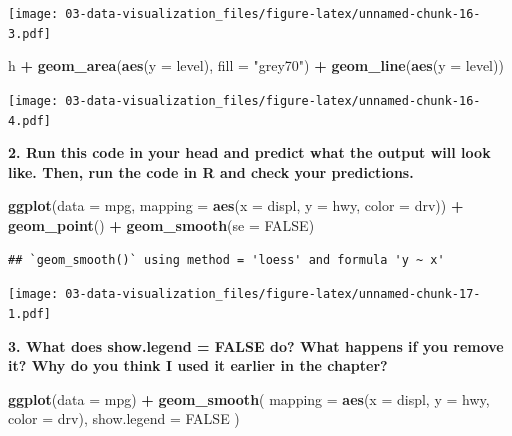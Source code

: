 \documentclass[]{book}
\newenvironment{Shaded}{\begin{snugshade}}{\end{snugshade}}
\newcommand{\DataTypeTok}[1]{\textcolor[rgb]{0.13,0.29,0.53}{#1}}
\newcommand{\KeywordTok}[1]{\textcolor[rgb]{0.13,0.29,0.53}{\textbf{#1}}}
\newcommand{\NormalTok}[1]{#1}
\newcommand{\OperatorTok}[1]{\textcolor[rgb]{0.81,0.36,0.00}{\textbf{#1}}}
\newcommand{\OtherTok}[1]{\textcolor[rgb]{0.56,0.35,0.01}{#1}}
\newcommand{\StringTok}[1]{\textcolor[rgb]{0.31,0.60,0.02}{#1}}
\theoremstyle{definition}
\theoremstyle{definition}
\theoremstyle{definition}
\theoremstyle{remark}
\begin{document}
\texttt{[image: 03-data-visualization\_files/figure-latex/unnamed-chunk-16-3.pdf]}

\begin{Shaded}
\begin{Highlighting}[]
\NormalTok{h }\OperatorTok{+}
\StringTok{  }\KeywordTok{geom_area}\NormalTok{(}\KeywordTok{aes}\NormalTok{(}\DataTypeTok{y =}\NormalTok{ level), }\DataTypeTok{fill =} \StringTok{"grey70"}\NormalTok{) }\OperatorTok{+}
\StringTok{  }\KeywordTok{geom_line}\NormalTok{(}\KeywordTok{aes}\NormalTok{(}\DataTypeTok{y =}\NormalTok{ level))}
\end{Highlighting}
\end{Shaded}

\texttt{[image: 03-data-visualization\_files/figure-latex/unnamed-chunk-16-4.pdf]}

\textbf{2. Run this code in your head and predict what the output will
look like. Then, run the code in R and check your predictions.}

\begin{Shaded}
\begin{Highlighting}[]
\KeywordTok{ggplot}\NormalTok{(}\DataTypeTok{data =}\NormalTok{ mpg, }\DataTypeTok{mapping =} \KeywordTok{aes}\NormalTok{(}\DataTypeTok{x =}\NormalTok{ displ, }\DataTypeTok{y =}\NormalTok{ hwy, }\DataTypeTok{color =}\NormalTok{ drv)) }\OperatorTok{+}\StringTok{ }
\StringTok{  }\KeywordTok{geom_point}\NormalTok{() }\OperatorTok{+}\StringTok{ }
\StringTok{  }\KeywordTok{geom_smooth}\NormalTok{(}\DataTypeTok{se =} \OtherTok{FALSE}\NormalTok{)}
\end{Highlighting}
\end{Shaded}

\begin{verbatim}
## `geom_smooth()` using method = 'loess' and formula 'y ~ x'
\end{verbatim}

\texttt{[image: 03-data-visualization\_files/figure-latex/unnamed-chunk-17-1.pdf]}

\textbf{3. What does show.legend = FALSE do? What happens if you remove
it? Why do you think I used it earlier in the chapter?}

\begin{Shaded}
\begin{Highlighting}[]
\KeywordTok{ggplot}\NormalTok{(}\DataTypeTok{data =}\NormalTok{ mpg) }\OperatorTok{+}
\StringTok{  }\KeywordTok{geom_smooth}\NormalTok{(}
    \DataTypeTok{mapping =} \KeywordTok{aes}\NormalTok{(}\DataTypeTok{x =}\NormalTok{ displ, }\DataTypeTok{y =}\NormalTok{ hwy, }\DataTypeTok{color =}\NormalTok{ drv),}
    \DataTypeTok{show.legend =} \OtherTok{FALSE}
\NormalTok{  )}
\end{Highlighting}
\end{Shaded}
\end{document}

